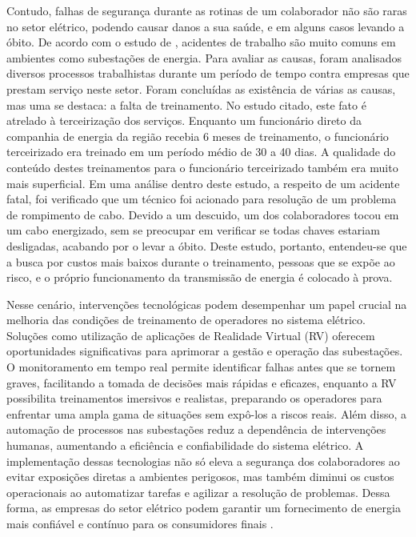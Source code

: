 Contudo, falhas de segurança durante as rotinas de um colaborador não são raras no setor elétrico, podendo causar danos a sua saúde, e em alguns casos levando a óbito. De acordo com o estudo de , acidentes de trabalho são muito comuns em ambientes como subestações de energia. Para avaliar as causas, foram analisados diversos processos trabalhistas durante um período de tempo contra empresas que prestam serviço neste setor. Foram concluídas as existência de várias as causas, mas uma se destaca: a falta de treinamento. No estudo citado, este fato é atrelado à terceirização dos serviços. Enquanto um funcionário direto da companhia de energia da região recebia 6 meses de treinamento, o funcionário terceirizado era treinado em um período médio de 30 a 40 dias. A qualidade do conteúdo destes treinamentos para o funcionário terceirizado também era muito mais superficial. Em uma análise dentro deste estudo, a respeito de um acidente fatal, foi verificado que um técnico foi acionado para resolução de um problema de rompimento de cabo. Devido a um descuido, um dos colaboradores tocou em um cabo energizado, sem se preocupar em verificar se todas chaves estariam desligadas, acabando por o levar a óbito. Deste estudo, portanto, entendeu-se que a busca por custos mais baixos durante o treinamento, pessoas que se expõe ao risco, e o próprio funcionamento da transmissão de energia é colocado à prova. 

Nesse cenário, intervenções tecnológicas podem desempenhar um papel crucial na melhoria das condições de treinamento de operadores no sistema elétrico. Soluções como utilização de aplicações de Realidade Virtual (RV) oferecem oportunidades significativas para aprimorar a gestão e operação das subestações. O monitoramento em tempo real permite identificar falhas antes que se tornem graves, facilitando a tomada de decisões mais rápidas e eficazes, enquanto a RV possibilita treinamentos imersivos e realistas, preparando os operadores para enfrentar uma ampla gama de situações sem expô-los a riscos reais. Além disso, a automação de processos nas subestações reduz a dependência de intervenções humanas, aumentando a eficiência e confiabilidade do sistema elétrico. A implementação dessas tecnologias não só eleva a segurança dos colaboradores ao evitar exposições diretas a ambientes perigosos, mas também diminui os custos operacionais ao automatizar tarefas e agilizar a resolução de problemas. Dessa forma, as empresas do setor elétrico podem garantir um fornecimento de energia mais confiável e contínuo para os consumidores finais \cite{zhou2016big}.

